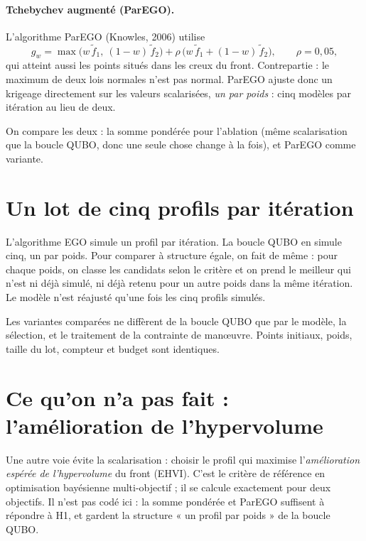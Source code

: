 \paragraph{Tchebychev augmenté (ParEGO).} L'algorithme ParEGO (Knowles, 2006) utilise
\[
g_w=\max\big(w\,\tilde f_1,\ (1-w)\,\tilde f_2\big)+\rho\,\big(w\,\tilde f_1+(1-w)\,\tilde f_2\big),\qquad\rho=0{,}05,
\]
qui atteint aussi les points situés dans les creux du front. Contrepartie : le maximum de deux lois normales n'est pas normal. ParEGO ajuste donc un krigeage directement sur les valeurs scalarisées, \emph{un par poids} : cinq modèles par itération au lieu de deux.

\begin{projet}
On compare les deux : la somme pondérée pour l'ablation (même scalarisation que la boucle QUBO, donc une seule chose change à la fois), et ParEGO comme variante.
\end{projet}

\section{Un lot de cinq profils par itération}
L'algorithme EGO simule un profil par itération. La boucle QUBO en simule cinq, un par poids. Pour comparer à structure égale, on fait de même : pour chaque poids, on classe les candidats selon le critère et on prend le meilleur qui n'est ni déjà simulé, ni déjà retenu pour un autre poids dans la même itération. Le modèle n'est réajusté qu'une fois les cinq profils simulés.

\begin{resultat}
Les variantes comparées ne diffèrent de la boucle QUBO que par le modèle, la sélection, et le traitement de la contrainte de manœuvre. Points initiaux, poids, taille du lot, compteur et budget sont identiques.
\end{resultat}

\section{Ce qu'on n'a pas fait : l'amélioration de l'hypervolume}
Une autre voie évite la scalarisation : choisir le profil qui maximise l'\emph{amélioration espérée de l'hypervolume} du front (EHVI). C'est le critère de référence en optimisation bayésienne multi-objectif ; il se calcule exactement pour deux objectifs. Il n'est pas codé ici : la somme pondérée et ParEGO suffisent à répondre à H1, et gardent la structure « un profil par poids » de la boucle QUBO.

